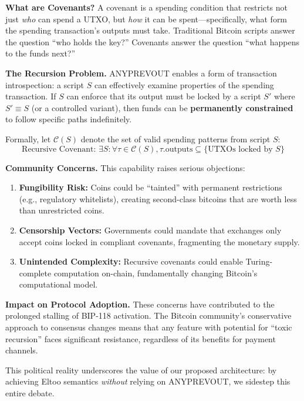 \textbf{What are Covenants?} A covenant is a spending condition that restricts not just \textit{who} can spend a UTXO, but \textit{how} it can be spent---specifically, what form the spending transaction's outputs must take. Traditional Bitcoin scripts answer the question ``who holds the key?'' Covenants answer the question ``what happens to the funds next?''

\textbf{The Recursion Problem.} ANYPREVOUT enables a form of transaction introspection: a script $S$ can effectively examine properties of the spending transaction. If $S$ can enforce that its output must be locked by a script $S'$ where $S' \equiv S$ (or a controlled variant), then funds can be \textbf{permanently constrained} to follow specific paths indefinitely.

Formally, let $\mathcal{C}(S)$ denote the set of valid spending patterns from script $S$:
$$\text{Recursive Covenant: } \exists S : \forall \tau \in \mathcal{C}(S), \tau.\text{outputs} \subseteq \{\text{UTXOs locked by } S\}$$

\textbf{Community Concerns.} This capability raises serious objections:
\begin{enumerate}
    \item \textbf{Fungibility Risk:} Coins could be ``tainted'' with permanent restrictions (e.g., regulatory whitelists), creating second-class bitcoins that are worth less than unrestricted coins.
    
    \item \textbf{Censorship Vectors:} Governments could mandate that exchanges only accept coins locked in compliant covenants, fragmenting the monetary supply.
    
    \item \textbf{Unintended Complexity:} Recursive covenants could enable Turing-complete computation on-chain, fundamentally changing Bitcoin's computational model.
\end{enumerate}

\textbf{Impact on Protocol Adoption.} These concerns have contributed to the prolonged stalling of BIP-118 activation. The Bitcoin community's conservative approach to consensus changes means that any feature with potential for ``toxic recursion'' faces significant resistance, regardless of its benefits for payment channels.

This political reality underscores the value of our proposed architecture: by achieving Eltoo semantics \textit{without} relying on ANYPREVOUT, we sidestep this entire debate.

